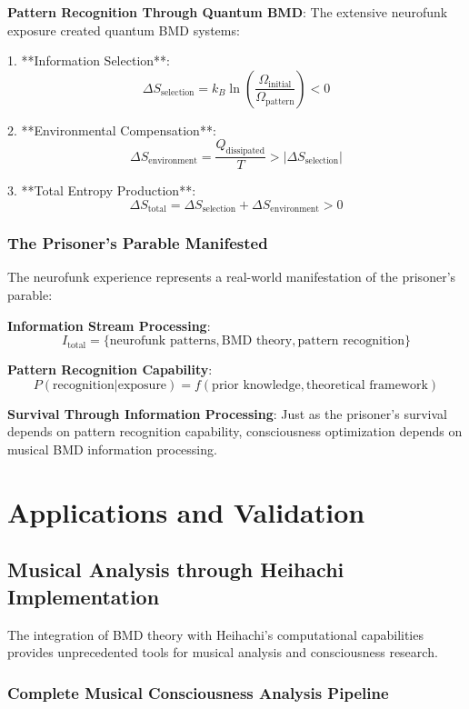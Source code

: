 \documentclass[12pt,a4paper]{article}
\begin{document}
\textbf{Pattern Recognition Through Quantum BMD}:
The extensive neurofunk exposure created quantum BMD systems:

1. **Information Selection**:
$$\Delta S_{\text{selection}} = k_B \ln\left(\frac{\Omega_{\text{initial}}}{\Omega_{\text{pattern}}}\right) < 0$$

2. **Environmental Compensation**:
$$\Delta S_{\text{environment}} = \frac{Q_{\text{dissipated}}}{T} > |\Delta S_{\text{selection}}|$$

3. **Total Entropy Production**:
$$\Delta S_{\text{total}} = \Delta S_{\text{selection}} + \Delta S_{\text{environment}} > 0$$

\subsubsection{The Prisoner's Parable Manifested}

The neurofunk experience represents a real-world manifestation of the prisoner's parable:

\textbf{Information Stream Processing}:
$$I_{\text{total}} = \{\text{neurofunk patterns}, \text{BMD theory}, \text{pattern recognition}\}$$

\textbf{Pattern Recognition Capability}:
$$P(\text{recognition}|\text{exposure}) = f(\text{prior knowledge}, \text{theoretical framework})$$

\textbf{Survival Through Information Processing}:
Just as the prisoner's survival depends on pattern recognition capability, consciousness optimization depends on musical BMD information processing.

\section{Applications and Validation}

\subsection{Musical Analysis through Heihachi Implementation}

The integration of BMD theory with Heihachi's computational capabilities provides unprecedented tools for musical analysis and consciousness research.

\subsubsection{Complete Musical Consciousness Analysis Pipeline}
\end{document}
